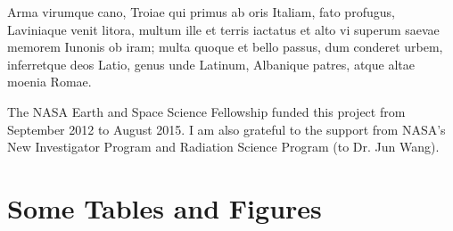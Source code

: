 \documentclass[phd, print]{nuthesis}
\begin{document}
\begin{acknowledgments}
  Arma virumque cano, Troiae qui primus ab oris Italiam, fato
  profugus, Laviniaque venit litora, multum ille et terris iactatus et
  alto vi superum saevae memorem Iunonis ob iram; multa quoque et
  bello passus, dum conderet urbem, inferretque deos Latio, genus unde
  Latinum, Albanique patres, atque altae moenia Romae.
\end{acknowledgments}

\begin{grantinfo}
  The NASA Earth and Space Science Fellowship funded this project from September 
  2012 to August 2015. I am also grateful to the support from NASA's New Investigator 
  Program and Radiation Science Program (to Dr. Jun Wang).
\end{grantinfo}

\tableofcontents
\begin{onehalfspacing}
\listoffigures
\listoftables
\end{onehalfspacing}

\mainmatter






\chapter{Some Tables and Figures}
\end{document}
